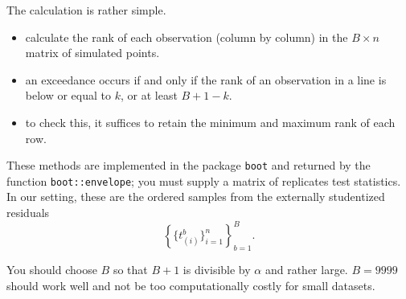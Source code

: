 \documentclass[]{book}
\providecommand{\tightlist}{%
  \setlength{\itemsep}{0pt}\setlength{\parskip}{0pt}}
\theoremstyle{definition}
\theoremstyle{definition}
\theoremstyle{definition}
\theoremstyle{remark}
\begin{document}
The calculation is rather simple.

\begin{itemize}
\tightlist
\item
  calculate the rank of each observation (column by column) in the \(B \times n\) matrix of simulated points.
\item
  an exceedance occurs if and only if the rank of an observation in a line is below or equal to \(k\), or at least \(B+1-k\).
\item
  to check this, it suffices to retain the minimum and maximum rank of each row.
\end{itemize}

These methods are implemented in the package \texttt{boot} and returned by the function \texttt{boot::envelope}; you must supply a matrix of replicates test statistics. In our setting, these are the ordered samples from the externally studentized residuals \[\left\{\big\{t^{b}_{(i)}\big\}_{i=1}^n\right\}_{b=1}^B.\]

You should choose \(B\) so that \(B+1\) is divisible by \(\alpha\) and rather large. \(B = 9999\) should work well and not be too computationally costly for small datasets.
\end{document}
